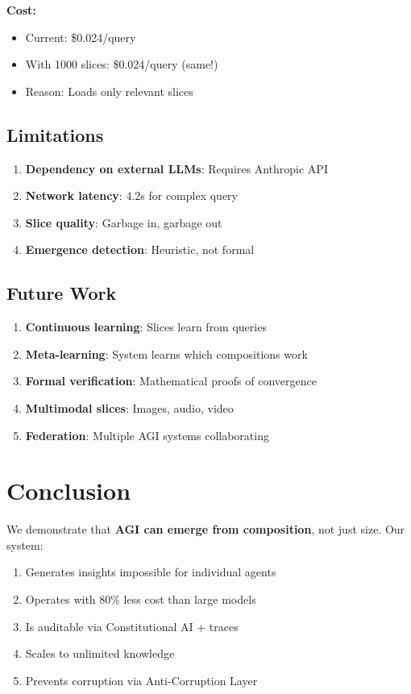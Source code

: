 \documentclass[11pt]{article}
\begin{document}
\textbf{Cost:}
\begin{itemize}
    \item Current: \$0.024/query
    \item With 1000 slices: \$0.024/query (same!)
    \item Reason: Loads only relevant slices
\end{itemize}

\subsection{Limitations}

\begin{enumerate}
    \item \textbf{Dependency on external LLMs}: Requires Anthropic API
    \item \textbf{Network latency}: 4.2s for complex query
    \item \textbf{Slice quality}: Garbage in, garbage out
    \item \textbf{Emergence detection}: Heuristic, not formal
\end{enumerate}

\subsection{Future Work}

\begin{enumerate}
    \item \textbf{Continuous learning}: Slices learn from queries
    \item \textbf{Meta-learning}: System learns which compositions work
    \item \textbf{Formal verification}: Mathematical proofs of convergence
    \item \textbf{Multimodal slices}: Images, audio, video
    \item \textbf{Federation}: Multiple AGI systems collaborating
\end{enumerate}

\section{Conclusion}

We demonstrate that \textbf{AGI can emerge from composition}, not just size. Our system:

\begin{enumerate}
    \item Generates insights impossible for individual agents
    \item Operates with 80\% less cost than large models
    \item Is auditable via Constitutional AI + traces
    \item Scales to unlimited knowledge
    \item Prevents corruption via Anti-Corruption Layer
\end{enumerate}
\end{document}
